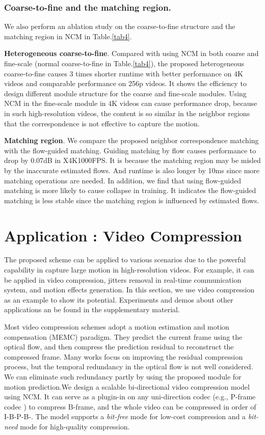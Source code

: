 \documentclass[sigconf]{acmart}
\begin{document}
\subsubsection{Coarse-to-fine and the matching region.}
We also perform an ablation study on the coarse-to-fine structure and the matching region in NCM in Table.\ref{tab4}. 

\textbf{Heterogeneous coarse-to-fine}. Compared with using NCM in both coarse and fine-scale (normal coarse-to-fine in Table.\ref{tab4}), the proposed heterogeneous coarse-to-fine causes 3 times shorter runtime with better performance on 4K videos and comparable performance on 256p videos. It shows the efficiency to design different module structure for the coarse and fine-scale modules. Using NCM in the fine-scale module in 4K videos can cause performance drop, because in such high-resolution videos, the content is so similar in the neighbor regions that the correspondence is not effective to capture the motion.

\textbf{Matching region}. We compare the proposed neighbor correspondence matching with the flow-guided matching. Guiding matching by flow causes performance to drop by 0.07dB in X4K1000FPS. It is because the matching region may be misled by the inaccurate estimated flows. And runtime is also longer by 10ms since more matching operations are needed. In addition, we find that using flow-guided matching is more likely to cause collapse in training. It indicates the flow-guided matching is less stable since the matching region is influenced by estimated flows.


\section{Application : Video Compression}

The proposed scheme can be applied to various scenarios due to the powerful capability in capture large motion in high-resolution videos. For example, it can be applied in video compression, jitters removal in real-time communication system, and motion effects generation. In this section, we use video compression as an example to show its potential. Experiments and demos about other applications an be found in the supplementary material. 

Most video compression schemes  \cite{lu2019dvc,lu2020end,yang2020learning,li2021deep,sheng2021temporal} adopt a motion estimation and motion compensation (MEMC) paradigm. They predict the current frame using the optical flow, and then compress the prediction residual to reconstruct the compressed frame. Many works \cite{yang2020learning,li2021deep,sheng2021temporal} focus on improving the residual compression process, but the temporal redundancy in the optical flow is not well considered. We can eliminate such redundancy partly by using the proposed module for motion prediction.We design a scalable bi-directional video compression model using NCM. It can serve as a plugin-in on any uni-direction codec (e.g.,  P-frame codec  \cite{sheng2021temporal, HM}) to compress B-frame, and the whole video can be compressed in order of I-B-P-B-. The model supports a \textit{bit-free} mode for low-cost compression and a \textit{bit-need} mode for high-quality compression.
\end{document}
